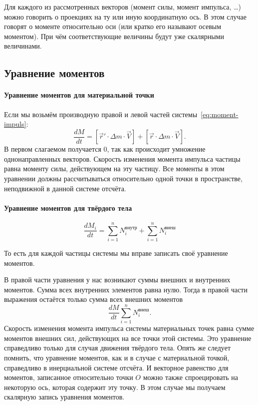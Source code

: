 \documentclass[10pt]{extbook}
\begin{document}
Для каждого из рассмотренных векторов (момент силы, момент импульса, \dots)
можно говорить о проекциях на ту или иную координатную ось. В этом случае
говорят о моменте относительно оси (или кратко его называют осевым моментом).
При чём соответствующие величины будут уже скалярными величинами.

\subsection{Уравнение моментов}%

\paragraph{Уравнение моментов для материальной точки}

Если мы возьмём производную правой и левой частей
системы~\ref{eq:moment-impuls}: \[
	\frac{d M}{d t} = [\vec{r}' \cdot \Delta m \cdot \vec{V}] + [\vec{r} \cdot \Delta m \cdot \vec{V}]
	.\] В первом слагаемом получается 0, так как происходит умножение
однонаправленных векторов. Скорость изменения момента импульса частицы равна
моменту силы, действующем на эту частицу. Все моменты в этом уравнении должны
рассчитываться относительно одной точки в пространстве, неподвижной в данной
системе отсчёта.

\paragraph{Уравнение моментов для твёрдого тела}

\begin{equation}
	\frac{d M_i}{d t} = \sum_{i=1}^{n} N_i^\text{внутр} + \sum_{i=1}^{n} N_i^\text{внеш}
\end{equation}

То есть для каждой частицы системы мы вправе записать своё уравнение моментов.

В правой части уравнения у нас возникают суммы внешних и внутренних моментов.
Сумма всех внутренних элементов равна нулю. Тогда в правой части выражения
остаётся только сумма всех внешних моментов \[
	\frac{d M}{d t} \sum_{i=1}^{n} N_i^\text{внеш}
	.\] Скорость изменения момента импульса системы материальных точек равна
сумме моментов внешних сил, действующих на все точки этой системы. Это
уравнение справедливо только для случая движения твёрдого тела. Опять же
следует помнить, что уравнение моментов, как и в случае с материальной
точкой, справедливо в инерциальной системе отсчёта. И векторное равенство для
моментов, записанное относительно точки \( O \) можно также спроецировать на
некоторую ось, которая содержит эту точку. В этом случае мы получаем
скалярную запись уравнения моментов.
\end{document}
